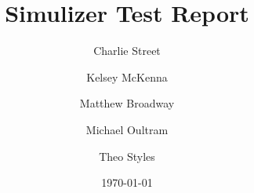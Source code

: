 \documentclass{article}
\title{\huge\textbf{Simulizer Test Report}}
\author{
  Charlie Street
  \and
  Kelsey McKenna
  \and
  Matthew Broadway
  \and
  Michael Oultram
  \and
  Theo Styles
}
\date{\today}
\begin{document}
\maketitle


\begin{landscape}

\end{landscape}

\end{document}
